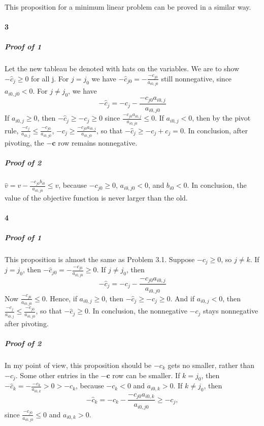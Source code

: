 \documentclass[22pt]{article}
\begin{document}
	This proposition for a minimum linear problem can be proved in a similar way.

	\paragraph{3}
		\subparagraph{Proof of 1}Let the new tableau be denoted with hats on the variables. We are to show $-\hat{c}_j \geq 0$ for all j. For $j = j_0$ we have $-\hat{c}_{j0} = -\frac{-c_{j0}}{a_{i0,j0}}$ still nonnegative, since $a_{i0,j0} < 0$. For $j \not= j_0$, we have 
		\begin{equation}
			-\hat{c}_j = -c_j - \frac{-c_{j0}a_{i0,j}}{a_{i0,j0}}
		\end{equation}
		If $a_{i0,j} \geq 0$, then $-\hat{c}_j \geq -c_j \geq 0$ since $\frac{-c_{j0}a_{i0,j}}{a_{i0,j0}} \leq 0$. If $a_{i0,j} < 0$, then by the pivot rule, $\frac{-c_j}{a_{i0,j}} \leq \frac{-c_{j0}}{a_{i0,j0}}$, $-c_j \geq \frac{-c_{j0}a_{i0,j}}{a_{i0,j0}}$, so that $-\hat{c}_j \geq -c_j + c_j = 0$. In conclusion, after pivoting, the $-\mathbf{c}$ row remains nonnegative.

		\subparagraph{Proof of 2} $\hat{v} = v - \frac{-c_{j0}b_{i0}}{a_{i0,j0}} \leq v$, because $-c_{j0} \geq 0$, $a_{i0,j0} < 0$, and $b_{i0} < 0$. In conclusion, the value of the objective function is never larger than the old.

	\paragraph{4}
		\subparagraph{Proof of 1}This proposition is almost the same as Problem 3.1. Suppose $-c_j \geq 0$, so $j \not= k$. If $j = j_0$, then  $-\hat{c}_{j0} = -\frac{-c_{j0}}{a_{i0,j0}} \geq 0$. If $j \not= j_0$, then
		\begin{equation}
			-\hat{c}_j = -c_j - \frac{-c_{j0}a_{i0,j}}{a_{i0,j0}}
		\end{equation}
		Now $\frac{-c_{j0}}{a_{i0,j0}} \leq 0$. Hence, if $a_{i0,j} \geq 0$, then $-\hat{c}_j \geq -c_j \geq 0$. And if $a_{i0,j} < 0$, then $\frac{-c_j}{a_{i0,j}} \leq \frac{-c_{j0}}{a_{i0,j0}}$, so that $-\hat{c}_j \geq 0$. In conclusion, the nonnegative $-c_j$ stays nonnegative after pivoting.

		\subparagraph{Proof of 2} In my point of view, this proposition should be $-c_k$ gets no smaller, rather than $-c_j$. Some other entries in the $-\mathbf{c}$ row can be smaller. If $k = j_0$, then $-\hat{c}_{k} = -\frac{-c_{k}}{a_{i0,k}} > 0 > -c_k$, because $-c_k < 0$ and $a_{i0,k}>0$. If $k \not= j_0$, then
		\begin{equation}
			-\hat{c}_k = -c_k - \frac{-c_{j0}a_{i0,k}}{a_{i0,j0}} \geq -c_j,
		\end{equation}
		since $\frac{-c_{j0}}{a_{i0,j0}} \leq 0$ and $a_{i0,k} > 0$.
\end{document}
